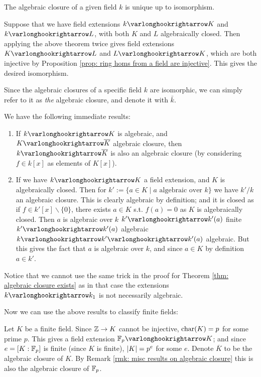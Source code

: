 \documentclass{article}
\begin{document}
\begin{corollary}\label{cor: algebraic closure is unique}
    The algebraic closure of a given field $k$ is unique up to isomorphism.

    Suppose that we have field extensions $k \ext K$ and $k \ext L$, with both $K$ and $L$ algebraically closed. Then applying the above theorem twice gives field extensions $K \ext L$ and $L \ext K$, which are both injective by Proposition \ref{prop: ring homs from a field are injective}. This gives the desired isomorphism.
\end{corollary}

\begin{notation}
    Since the algebraic closures of a specific field $k$ are isomorphic, we can simply refer to it as \emph{the} algebraic closure, and denote it with $\bar{k}$.
\end{notation}

\begin{remark}\label{rmk: misc results on algebraic closure}
    We have the following immediate results:
    \begin{enumerate}[label=\arabic*)]
        \item If $k \ext K$ is algebraic, and $K \ext \overline{K}$ algebraic closure, then $k \ext \overline{K}$ is also an algebraic closure (by considering $f \in k[x]$ as elements of $K[x]$).
        \item If we have $k \ext K$ a field extension, and $K$ is algebraically closed. Then for $k' := \{a \in K \mid \text{$a$ algebraic over $k$}\}$ we have $k'/k$ an algebraic closure. This is clearly algebraic by definition; and it is closed as if $f \in k'[x] \smallsetminus \{0\}$, there exists $a \in K$ s.t. $f(a) = 0$ as $K$ is algebraically closed. Then $a$ is algebraic over $k$ \implies $k' \ext k'(a)$ finite \implies $k' \ext k'(a)$ algebraic \implies $k \ext k' \ext k'(a)$ algebraic. But this gives the fact that $a$ is algebraic over $k$, and since $a \in K$ by definition $a \in k'$.  
    \end{enumerate}
    Notice that we cannot use the same trick in the proof for Theorem \ref{thm: algebraic closure exists} as in that case the extensions $k \ext k_1$ is not necessarily algebraic.
\end{remark}

\textstart
Now we can use the above results to classify finite fields:

Let $K$ be a finite field. Since $\mathbb{Z} \to K$ cannot be injective, $\mathrm{char}(K) = p$ for some prime $p$. This gives a field extension $\F_p \ext K$; and since $e = [K : \mathbb{F}_p]$ is finite (since $K$ is finite), $\left|K\right| = p^e$ for some $e$. Denote $\overline{K}$ to be the algebraic closure of $K$. By Remark \ref{rmk: misc results on algebraic closure} this is also the algebraic closure of $\mathbb{F}_p$.
\end{document}
